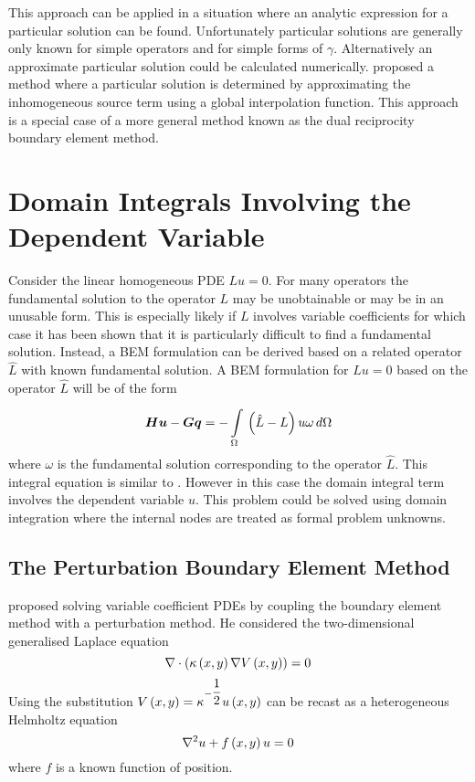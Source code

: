 This approach can be applied in a situation where an analytic expression
for a particular solution can be found.  Unfortunately particular solutions
are generally only known for simple operators and for simple forms of
$\gamma$.  Alternatively an approximate particular solution could be
calculated numerically.   proposed a method
where a particular solution is determined by approximating the
inhomogeneous source term using a global interpolation function.  This
approach is a special case of a more general method known as the dual
reciprocity boundary element method.

\section{Domain Integrals Involving the Dependent Variable}

Consider the linear homogeneous PDE $Lu = 0$.  For many operators the
fundamental solution to the operator $L$ may be unobtainable or may be in
an unusable form.  This is especially likely if $L$ involves variable
coefficients for which case it has been shown that it is particularly
difficult to find a fundamental solution.  Instead, a BEM formulation can
be derived based on a related operator $\hat{L}$ with known fundamental
solution.  A BEM formulation for $Lu = 0$ based on the operator $\hat{L}$
will be of the form
\begin{equation}
  \matr{H} \vect{u} - \matr{G} \vect{q} 
            = -\goneint{\pbrac{\hat{L} - L} u \omega}{\Omega}
\label{eq:relate}
\end{equation}
where $\omega$ is the fundamental solution corresponding to the operator 
$\hat{L}$. This integral equation is similar to .  
However in this case the domain integral term involves the dependent
variable $u$.  This problem could be solved using domain integration where
the internal nodes are treated as formal problem unknowns. 

\subsection{The Perturbation Boundary Element Method}

 proposed solving variable coefficient PDEs by
coupling the boundary element method with a perturbation method. He
considered the two-dimensional generalised Laplace equation
\begin{equation}
  \nabla \cdot \left(   \kappa\left( x,y \right) \nabla V\left( x,y \right)   \right) = 0
\label{eq:rangge2}
\end{equation}
Using the substitution $ V\left( x,y \right)  = \kappa^{-\dfrac{1}{2}}  u\left( x,y \right) $
 can be recast as a heterogeneous Helmholtz equation
\begin{equation}
  \laplacian{}{u} + \fnof{f}{x,y}u = 0
\label{eq:varhelm2}
\end{equation}
where $f$ is a known function of position.

